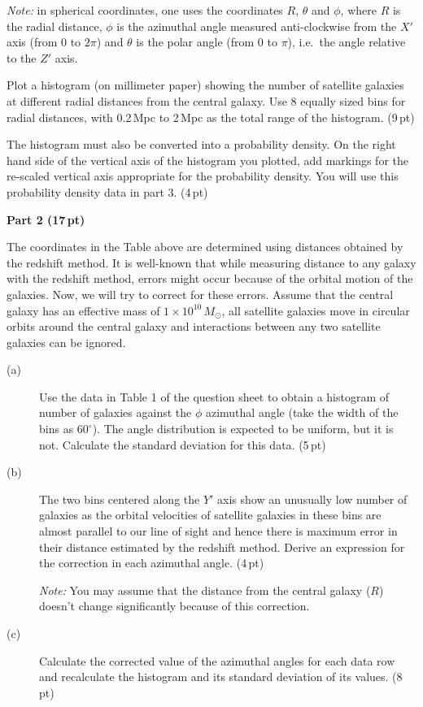 \begin{description}
  \emph{Note:} in spherical coordinates, one uses the coordinates $R$,
  $\theta$ and $\phi$, where $R$ is the radial distance, $\phi$ is the
  azimuthal angle measured anti-clockwise from the $X'$ axis (from 0 to
  $2\pi$) and $\theta$ is the polar angle (from 0 to $\pi$), i.e.\ the angle
  relative to the $Z'$ axis.
\item[(f)] Plot a histogram (on millimeter paper) showing the number of
  satellite galaxies at different radial distances from the central galaxy.
  Use 8 equally sized bins for radial distances, with 0.2\,Mpc to 2\,Mpc as
  the total range of the histogram. \hfill(9\,pt)
\item[(g)] The histogram must also be converted into a probability density. On
  the right hand side of the vertical axis of the histogram you plotted, add
  markings for the re-scaled vertical axis appropriate for the probability
  density. You will use this probability density data in part 3. \hfill(4\,pt)
\end{description}

\medskip
\textbf{Part 2 (17\,pt)}

The coordinates in the Table above are determined using distances obtained by
the redshift method. It is well-known that while measuring distance to any
galaxy with the redshift method, errors might occur because of the orbital
motion of the galaxies. Now, we will try to correct for these errors. Assume
that the central galaxy has an effective mass of $1 \times 10^{10}\,M_\odot$,
all satellite galaxies move in circular orbits around the central galaxy and
interactions between any two satellite galaxies can be ignored.

\begin{description}
\item[(a)] Use the data in Table 1 of the question sheet to obtain a histogram
  of number of galaxies against the $\phi$ azimuthal angle (take the width of
  the bins as $60^\circ$). The angle distribution is expected to be uniform,
  but it is not. Calculate the standard deviation for this data. \hfill(5\,pt)
\item[(b)] The two bins centered along the $Y'$ axis show an unusually low
  number of galaxies as the orbital velocities of satellite galaxies in these
  bins are almost parallel to our line of sight and hence there is maximum
  error in their distance estimated by the redshift method. Derive an
  expression for the correction in each azimuthal angle. \hfill(4\,pt)

  \emph{Note:} You may assume that the distance from the central galaxy ($R$)
  doesn't change significantly because of this correction.
\item[(c)] Calculate the corrected value of the azimuthal angles for each data
  row and recalculate the histogram and its standard deviation of its values.
  \hfill(8\,pt)
\end{description}

